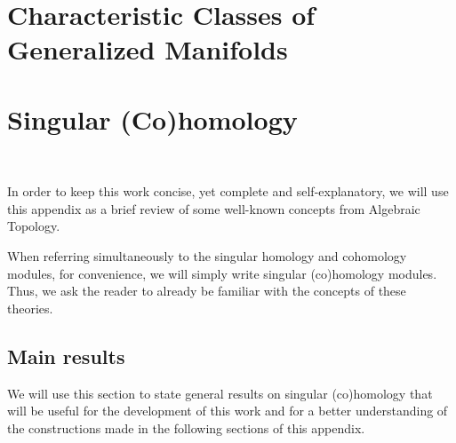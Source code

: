 \documentclass[12pt,oneside]{book}
\begin{document}
    



    \chapter{Characteristic Classes of Generalized Manifolds}\label{cap_wu_gen}
    \thispagestyle{empty}



    \appendix

    \chapter{Singular (Co)homology}\label{ap_(co)_sing}
    \thispagestyle{empty}

    \

    In order to keep this work concise, yet complete and self-explanatory, we will use this appendix as 
    a brief review of some well-known concepts from Algebraic Topology.

    When referring simultaneously to the singular homology and cohomology modules, for convenience, we 
    will simply write singular (co)homology modules. Thus, we ask the 
    reader to already be familiar with the concepts of these theories.
    
    \section{Main results}\label{ap_principais_res}
    
    We will use this section to state general results on singular (co)homology that will be useful for 
    the development of this work and for a better understanding of the constructions made in the 
    following sections of this appendix.
    
\end{document}

